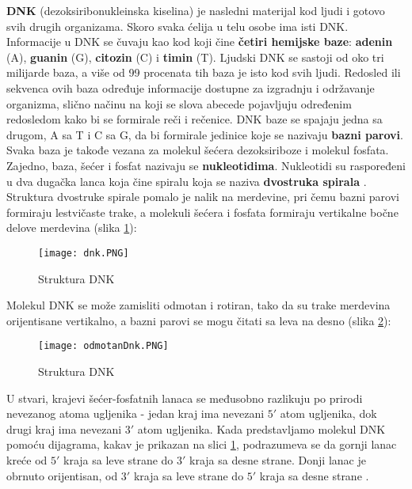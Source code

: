 \documentclass[12pt,oneside]{memoir}
\begin{document}
\textbf{DNK} (dezoksiribonukleinska kiselina) je nasledni materijal kod ljudi i gotovo svih drugih organizama. Skoro svaka ćelija u telu osobe ima isti DNK. Informacije u DNK se čuvaju kao kod koji čine \textbf{četiri hemijske baze}: \textbf{adenin} (A), \textbf{guanin} (G), \textbf{citozin} (C) i \textbf{timin} (T). Ljudski DNK se sastoji od oko tri milijarde baza, a više od 99 procenata tih baza je isto kod svih ljudi. Redosled ili sekvenca ovih baza određuje informacije dostupne za izgradnju i održavanje organizma, slično načinu na koji se slova abecede pojavljuju određenim redosledom kako bi se formirale reči i rečenice. DNK baze se spajaju jedna sa drugom, A sa T i C sa G, da bi formirale jedinice koje se nazivaju \textbf{bazni parovi}. Svaka baza je takođe vezana za molekul šećera dezoksiriboze i molekul fosfata. Zajedno, baza, šećer i fosfat nazivaju se \textbf{nukleotidima}. Nukleotidi su raspoređeni u dva dugačka lanca koja čine spiralu koja se naziva \textbf{dvostruka spirala} \cite{DNA}. Struktura dvostruke spirale pomalo je nalik na merdevine, pri čemu bazni parovi formiraju lestvičaste trake, a molekuli šećera i fosfata formiraju vertikalne bočne delove merdevina (slika \ref{fig:00}):

\newpage

\begin{figure}[!ht]
  \centering
  \texttt{[image: dnk.PNG]}
  \caption{Struktura DNK}
  \label{fig:00}
\end{figure}

Molekul DNK se može zamisliti odmotan i rotiran, tako da su trake merdevina orijentisane vertikalno, a bazni parovi se mogu čitati sa leva na desno (slika \ref{fig:odmotanDnk}):

\begin{figure}[!ht]
  \centering
  \texttt{[image: odmotanDnk.PNG]}
  \caption{Struktura DNK}
  \label{fig:odmotanDnk}
\end{figure}

U stvari, krajevi šećer-fosfatnih lanaca se međusobno razlikuju po prirodi nevezanog atoma ugljenika - jedan kraj ima nevezani $5'$ atom ugljenika, dok drugi kraj ima nevezani $3'$ atom ugljenika. Kada predstavljamo molekul DNK pomoću dijagrama, kakav je prikazan na slici \ref{fig:00}, podrazumeva se da gornji lanac kreće od $5'$ kraja sa leve strane do $3'$ kraja sa desne strane. Donji lanac je obrnuto orijentisan, od $3'$ kraja sa leve strane do $5'$ kraja sa desne strane \cite{DNA2}. 
\end{document}
